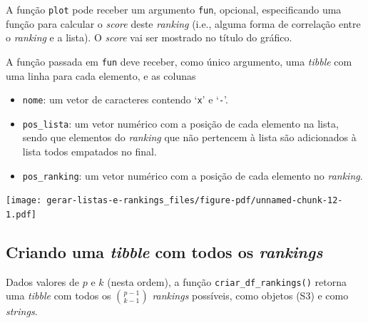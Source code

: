 \documentclass[
  letterpaper,
  DIV=11,
  numbers=noendperiod]{scrreprt}
\newenvironment{Shaded}{\begin{snugshade}}{\end{snugshade}}
\newcommand{\AttributeTok}[1]{\textcolor[rgb]{0.40,0.45,0.13}{#1}}
\newcommand{\DecValTok}[1]{\textcolor[rgb]{0.68,0.00,0.00}{#1}}
\newcommand{\FunctionTok}[1]{\textcolor[rgb]{0.28,0.35,0.67}{#1}}
\newcommand{\NormalTok}[1]{\textcolor[rgb]{0.00,0.23,0.31}{#1}}
\newcommand{\SpecialCharTok}[1]{\textcolor[rgb]{0.37,0.37,0.37}{#1}}
\providecommand{\tightlist}{%
  \setlength{\itemsep}{0pt}\setlength{\parskip}{0pt}}\usepackage{longtable,booktabs,array}
\begin{document}
A função \texttt{plot} pode receber um argumento \texttt{fun}, opcional,
especificando uma função para calcular o \emph{score} deste
\emph{ranking} (i.e., alguma forma de correlação entre o \emph{ranking}
e a lista). O \emph{score} vai ser mostrado no título do gráfico.

A função passada em \texttt{fun} deve receber, como único argumento, uma
\emph{tibble} com uma linha para cada elemento, e as colunas

\begin{itemize}
\tightlist
\item
  \texttt{nome}: um vetor de caracteres contendo `\texttt{x}' e
  `\texttt{-}'.
\item
  \texttt{pos\_lista}: um vetor numérico com a posição de cada elemento
  na lista, sendo que elementos do \emph{ranking} que não pertencem à
  lista são adicionados à lista todos empatados no final.
\item
  \texttt{pos\_ranking}: um vetor numérico com a posição de cada
  elemento no \emph{ranking}.
\end{itemize}

\begin{Shaded}
\end{Shaded}

\begin{center}
\texttt{[image: gerar-listas-e-rankings\_files/figure-pdf/unnamed-chunk-12-1.pdf]}
\end{center}

\subsection{\texorpdfstring{Criando uma \emph{tibble} com todos os
\emph{rankings}}{Criando uma tibble com todos os rankings}}\label{criando-uma-tibble-com-todos-os-rankings}

Dados valores de $p$ e $k$ (nesta ordem), a função
\texttt{criar\_df\_rankings()} retorna uma \emph{tibble} com todos os
$\binom{p - 1}{k - 1}$ \emph{rankings} possíveis, como objetos (S3) e
como \emph{strings}.
\end{document}

